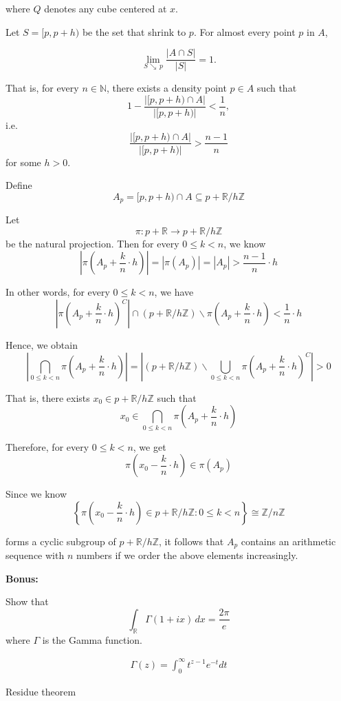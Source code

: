\documentclass[UTF8,a4paper,10pt]{article}
\begin{document}
where \(Q\) denotes any cube centered at \(x\).

Let \(S = [p,p+h)\) be the set that shrink to \(p\). For almost every point $p$ in $A$, 

\[
\lim_{S\searrow\, p} \frac{|A \cap S|}{|S|} = 1
.\]

That is, for every \( n \in \mathbb{N} \), there exists a density point \( p \in A \) such that
\[ 1 - \frac{|[p,p+h) \cap A|}{|[p,p+h)|} < \frac{1}{n} ,\]
i.e.
\[ \frac{|[p,p+h) \cap A|}{|[p,p+h)|} > \frac{n-1}{n} \]
for some \( h > 0 \). 

Define
\[ A_p = [p,p+h) \cap A \subseteq p + \mathbb{R} / h\mathbb{Z} \]

Let
\[ \pi : p + \mathbb{R} \rightarrow p + \mathbb{R} / h\mathbb{Z} \]
be the natural projection. Then for every \( 0 \leq k < n \), we know
\[ |\pi (A_p + \frac{k}{n} \cdot h)| = |\pi(A_p)| = |A_p| > \frac{n - 1}{n} \cdot h \]

In other words, for every \( 0 \leq k < n \), we have
\[ \left| \pi \left( A_p + \frac{k}{n} \cdot h \right)^C \right| \cap \left( p + \mathbb{R} / h\mathbb{Z} \right) \backslash \pi \left( A_p + \frac{k}{n} \cdot h \right) < \frac{1}{n} \cdot h \]

Hence, we obtain
\[ \left| \bigcap_{0\leq k < n} \pi \left( A_p + \frac{k}{n} \cdot h \right) \right| = \left| \left( p + \mathbb{R} / h\mathbb{Z} \right) \backslash \bigcup_{0\leq k < n} \pi \left( A_p + \frac{k}{n} \cdot h \right)^C \right| > 0 \]

That is, there exists \( x_0 \in p + \mathbb{R} / h\mathbb{Z} \) such that
\[ x_0 \in \bigcap_{0\leq k < n} \pi \left( A_p + \frac{k}{n} \cdot h \right) \]

Therefore, for every \( 0 \leq k < n \), we get
\[ \pi \left( x_0 - \frac{k}{n} \cdot h \right) \in \pi(A_p) \]

Since we know
\[ \left\{ \pi \left( x_0 - \frac{k}{n} \cdot h \right) \in  p + \mathbb{R} / h\mathbb{Z} : 0 \leq k < n \right\}  \cong \mathbb{Z} / n\mathbb{Z} \]

forms a cyclic subgroup of \( p + \mathbb{R} / h\mathbb{Z} \), it follows that \( A_p \) contains an arithmetic sequence with \( n \) numbers if we order the above elements increasingly.



\begin{Problem}[]{\textbf{Bonus:}}

 Show that
$$
\int_{\mathbb{R}} \Gamma(1 + ix) \, dx = \frac{2\pi}{e}
$$
where $\Gamma$ is the Gamma function.


\end{Problem}


\begin{equation*}
  \begin{aligned}
    \Gamma(z) = \int_{0}^{\infty} t^{z-1} e^{-t} dt
  \end{aligned}
\end{equation*}


Residue theorem
\end{document}
